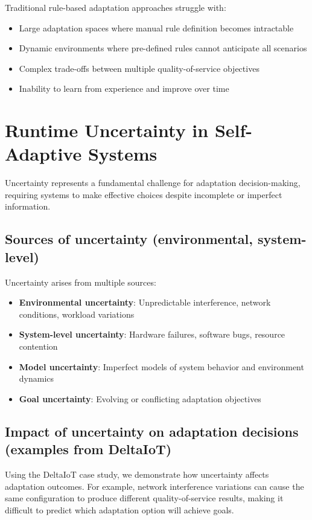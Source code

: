 \documentclass[11pt,a4paper]{article}
\begin{document}
Traditional rule-based adaptation approaches struggle with:
\begin{itemize}
    \item Large adaptation spaces where manual rule definition becomes intractable
    \item Dynamic environments where pre-defined rules cannot anticipate all scenarios
    \item Complex trade-offs between multiple quality-of-service objectives
    \item Inability to learn from experience and improve over time
\end{itemize}

\section{Runtime Uncertainty in Self-Adaptive Systems}

Uncertainty represents a fundamental challenge for adaptation decision-making, requiring systems to make effective choices despite incomplete or imperfect information.

\subsection{Sources of uncertainty (environmental, system-level)}

Uncertainty arises from multiple sources:
\begin{itemize}
    \item \textbf{Environmental uncertainty}: Unpredictable interference, network conditions, workload variations
    \item \textbf{System-level uncertainty}: Hardware failures, software bugs, resource contention
    \item \textbf{Model uncertainty}: Imperfect models of system behavior and environment dynamics
    \item \textbf{Goal uncertainty}: Evolving or conflicting adaptation objectives
\end{itemize}

\subsection{Impact of uncertainty on adaptation decisions (examples from DeltaIoT)}

Using the DeltaIoT case study, we demonstrate how uncertainty affects adaptation outcomes. For example, network interference variations can cause the same configuration to produce different quality-of-service results, making it difficult to predict which adaptation option will achieve goals.
\end{document}
